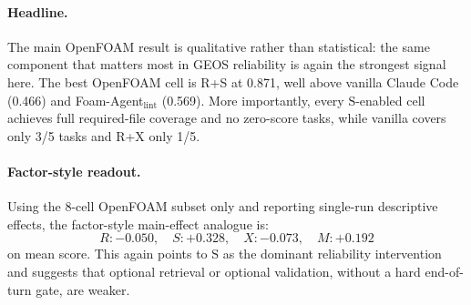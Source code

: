 \documentclass{article}
\begin{document}
\paragraph{Headline.}
The main OpenFOAM result is qualitative rather than statistical: the same component that matters most in GEOS reliability is again the strongest signal here. The best OpenFOAM cell is R+S at 0.871, well above vanilla Claude Code (0.466) and Foam-Agent$_{\text{lint}}$ (0.569). More importantly, every $\mathrm{S}$-enabled cell achieves full required-file coverage and no zero-score tasks, while vanilla covers only 3/5 tasks and R+X only 1/5.

\paragraph{Factor-style readout.}
Using the 8-cell OpenFOAM subset only and reporting single-run descriptive effects, the factor-style main-effect analogue is:
\[
R: -0.050,\quad
S: +0.328,\quad
X: -0.073,\quad
M: +0.192
\]
on mean score. This again points to $\mathrm{S}$ as the dominant reliability intervention and suggests that optional retrieval or optional validation, without a hard end-of-turn gate, are weaker.

\begin{table}[t]
  \caption{Per-task OpenFOAM transfer-study scores. The catastrophic failures are concentrated in non-$\mathrm{S}$ cells, especially Vanilla and R+X.}
  \label{tab:openfoam-per-task}
  \centering
  \footnotesize
\end{table}
\end{document}
